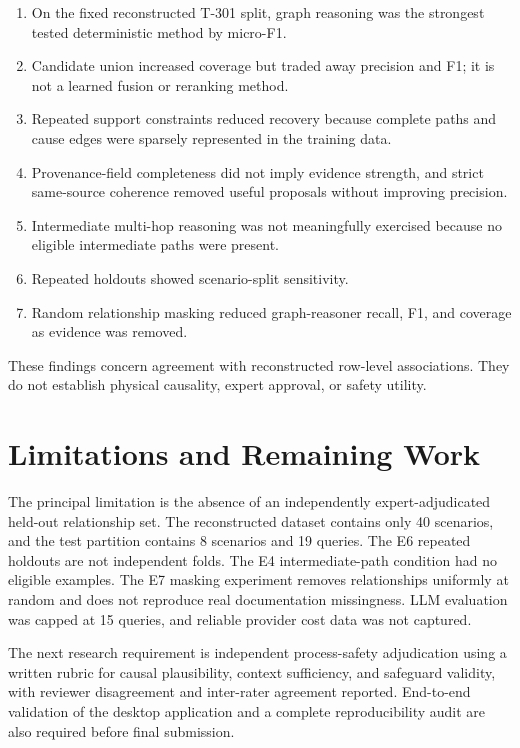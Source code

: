 \begin{enumerate}
    \item On the fixed reconstructed T-301 split, graph reasoning was the
    strongest tested deterministic method by micro-F1.
    \item Candidate union increased coverage but traded away precision and
    F1; it is not a learned fusion or reranking method.
    \item Repeated support constraints reduced recovery because complete
    paths and cause edges were sparsely represented in the training data.
    \item Provenance-field completeness did not imply evidence strength,
    and strict same-source coherence removed useful proposals without
    improving precision.
    \item Intermediate multi-hop reasoning was not meaningfully exercised
    because no eligible intermediate paths were present.
    \item Repeated holdouts showed scenario-split sensitivity.
    \item Random relationship masking reduced graph-reasoner recall,
    F1, and coverage as evidence was removed.
\end{enumerate}

These findings concern agreement with reconstructed row-level associations.
They do not establish physical causality, expert approval, or safety utility.

\section{Limitations and Remaining Work}

The principal limitation is the absence of an independently
expert-adjudicated held-out relationship set. The reconstructed dataset
contains only 40 scenarios, and the test partition contains 8 scenarios
and 19 queries. The E6 repeated holdouts are not independent folds.
The E4 intermediate-path condition had no eligible examples. The E7 masking
experiment removes relationships uniformly at random and does not reproduce
real documentation missingness. LLM evaluation was capped at 15 queries,
and reliable provider cost data was not captured.

The next research requirement is independent process-safety adjudication
using a written rubric for causal plausibility, context sufficiency, and
safeguard validity, with reviewer disagreement and inter-rater agreement
reported. End-to-end validation of the desktop application and a complete
reproducibility audit are also required before final submission.

